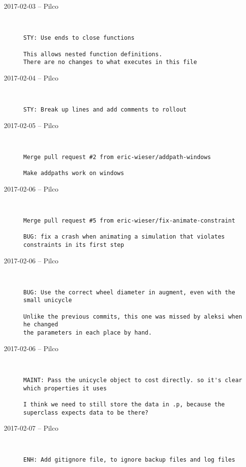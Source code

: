 \begin{description}
  \item[2017-02-03 -- Pilco] \hfill \
\begin{lstlisting}
STY: Use ends to close functions

This allows nested function definitions.
There are no changes to what executes in this file
\end{lstlisting}


  \item[2017-02-04 -- Pilco] \hfill \
\begin{lstlisting}
STY: Break up lines and add comments to rollout
\end{lstlisting}


  \item[2017-02-05 -- Pilco] \hfill \
\begin{lstlisting}
Merge pull request #2 from eric-wieser/addpath-windows

Make addpaths work on windows\end{lstlisting}


  \item[2017-02-06 -- Pilco] \hfill \
\begin{lstlisting}
Merge pull request #5 from eric-wieser/fix-animate-constraint

BUG: fix a crash when animating a simulation that violates constraints in its first step\end{lstlisting}


  \item[2017-02-06 -- Pilco] \hfill \
\begin{lstlisting}
BUG: Use the correct wheel diameter in augment, even with the small unicycle

Unlike the previous commits, this one was missed by aleksi when he changed
the parameters in each place by hand.
\end{lstlisting}


  \item[2017-02-06 -- Pilco] \hfill \
\begin{lstlisting}
MAINT: Pass the unicycle object to cost directly. so it's clear which properties it uses

I think we need to still store the data in .p, because the superclass expects data to be there?
\end{lstlisting}


  \item[2017-02-07 -- Pilco] \hfill \
\begin{lstlisting}
ENH: Add gitignore file, to ignore backup files and log files
\end{lstlisting}



\end{description}

